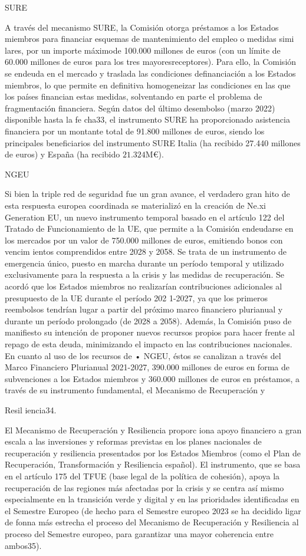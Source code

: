 \documentclass[10pt,a4paper]{article}
\begin{document}
SURE

A través del mecanismo SURE, la Comisión otorga préstamos a los Estados miembros para financiar esquemas de mantenimiento del empleo o medidas simi lares, por un importe máximode 100.000 millones de euros (con un límite de 60.000 millones de euros para los tres mayoresreceptores). Para ello, la Comisión se endeuda en el mercado y traslada las condiciones definanciación a los Estados miembros, lo que permite en definitiva homogeneizar las condiciones en las que los países financian estas medidas, solventando en parte el problema de fragmentación financiera. Según datos del último desembolso (marzo 2022) disponible hasta la fe cha33, el instrumento SURE ha proporcionado asistencia financiera por un montante total de 91.800 millones de euros, siendo los principales beneficiarios del instrumento SURE Italia (ha recibido 27.440 millones de euros) y España (ha recibido $21.324\text{M}€$).

NGEU

Si bien la triple red de seguridad fue un gran avance, el verdadero gran hito de esta respuesta europea coordinada se materializó en la creación de Ne.xi Generation EU, un nuevo instrumento temporal basado en el artículo 122 del Tratado de Funcionamiento de la UE, que permite a la Comisión endeudarse en los mercados por un valor de 750.000 millones de euros, emitiendo bonos con vencim ientos comprendidos entre 2028 y 2058. Se trata de un instrumento de emergencia único, puesto en marcha durante un período temporal y utilizado exclusivamente para la respuesta a la crisis y las medidas de recuperación. Se acordó que los Estados miembros no realizarían contribuciones adicionales al presupuesto de la UE durante el período 202 1-2027, ya que los primeros reembolsos tendrían lugar a partir del próximo marco financiero plurianual y durante un período prolongado (de 2028 a 2058). Además, la Comisión puso de manifiesto su intención de proponer nuevos recursos propios para hacer frente al repago de esta deuda, minimizando el impacto en las contribuciones nacionales. En cuanto al uso de los recursos de • NGEU, éstos se canalizan a través del Marco Financiero Plurianual 2021-2027, 390.000 millones de euros en forma de subvenciones a los Estados miembros y 360.000 millones de euros en préstamos, a través de su instrumento fundamental, el Mecanismo de Recuperación y


Resil iencia34.

El Mecanismo de Recuperación y Resiliencia proporc iona apoyo financiero a gran escala a las inversiones y reformas previstas en los planes nacionales de recuperación y resiliencia presentados por los Estados Miembros (como el Plan de Recuperación, Transformación y Resiliencia español). El instrumento, que se basa en el artículo 175 del TFUE (base legal de la política de cohesión), apoya la recuperación de las regiones más afectadas por la crisis y se centra así mismo especialmente en la transición verde y digital y en las prioridades identificadas en el Semestre Europeo (de hecho para el Semestre europeo 2023 se ha decidido ligar de fonna más estrecha el proceso del Mecanismo de Recuperación y Resiliencia al proceso del Semestre  europeo, para garantizar una mayor coherencia entre ambos35).
\end{document}
